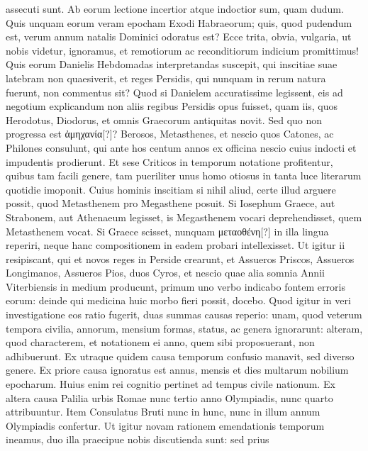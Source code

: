 assecuti sunt.
Ab eorum lectione incertior atque indoctior sum,
quam dudum.
Quis unquam eorum veram epocham Exodi Habraeorum;
quis, quod pudendum est, verum annum natalis Dominici odoratus
est?
Ecce trita, obvia, vulgaria, ut nobis videtur, ignoramus, et remotiorum
ac reconditiorum indicium promittimus!
Quis eorum Danielis
Hebdomadas interpretandas suscepit, qui inscitiae suae latebram
non quaesiverit, et reges Persidis, qui nunquam in rerum natura fuerunt,
non commentus sit?
%
Quod si Danielem accuratissime legissent,
eis ad negotium explicandum non aliis regibus Persidis opus fuisset,
quam iis, quos Herodotus, Diodorus, et omnis Graecorum antiquitas
novit.
Sed quo non progressa est \textgreek{ἀμηχανία[?]}?
Berosos, Metasthenes, et
nescio quos Catones, ac Philones consulunt, qui ante hos centum annos
ex officina nescio cuius indocti et impudentis prodierunt.
Et sese
Criticos in temporum notatione profitentur, quibus tam facili genere,
tam pueriliter unus homo otiosus in tanta luce literarum quotidie imoponit.
Cuius hominis inscitiam si nihil aliud, certe illud arguere
 possit, quod
Metasthenem pro Megasthene posuit.
Si Iosephum Graece, aut Strabonem,
aut Athenaeum legisset, is Megasthenem vocari deprehendisset,
quem Metasthenem vocat.
Si Graece scisset, nunquam \textgreek{μεταοθένη[?]} in illa
lingua reperiri, neque hanc compositionem in eadem probari intellexisset.
Ut igitur ii resipiscant, qui et novos reges in Perside crearunt,
et Assueros Priscos, Assueros Longimanos, Assueros Pios, duos Cyros,
et nescio quae alia somnia Annii Viterbiensis in medium producunt,
primum uno verbo indicabo fontem erroris eorum: deinde qui medicina
huic morbo fieri possit, docebo.
Quod igitur in veri investigatione
eos ratio fugerit, duas summas causas reperio: unam, quod veterum
tempora civilia, annorum, mensium formas, status, ac genera ignorarunt:
alteram, quod characterem, et notationem ei anno, quem sibi
proposuerant, non adhibuerunt.
Ex utraque quidem causa temporum
confusio manavit, sed diverso genere.
Ex priore causa ignoratus est
annus, mensis et dies multarum nobilium epocharum.
Huius enim
rei cognitio pertinet ad tempus civile nationum.
Ex altera causa Palilia
urbis Romae nunc tertio anno Olympiadis, nunc quarto attribuuntur.
Item Consulatus Bruti nunc in hunc, nunc in illum annum
Olympiadis confertur.
Ut igitur novam rationem emendationis temporum
ineamus, duo illa praecipue nobis discutienda sunt: sed prius
